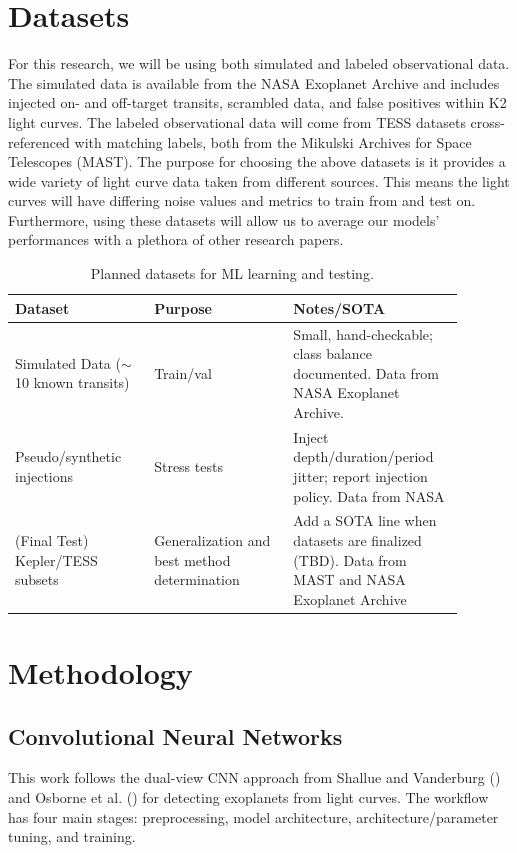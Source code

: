 \documentclass[letterpaper]{article} %
\begin{document}
\section*{Datasets}
For this research, we will be using both simulated and labeled observational data. The simulated data is available from the NASA Exoplanet Archive and includes injected on- and off-target transits, scrambled data, and false positives within K2 light curves. The labeled observational data will come from TESS datasets cross-referenced with matching labels, both from the Mikulski Archives for Space Telescopes (MAST). The purpose for choosing the above datasets is it provides a wide variety of light curve data taken from different sources. This means the light curves will have differing noise values and metrics to train from and test on. Furthermore, using these datasets will allow us to average our models' performances with a plethora of other research papers.

\begin{table}[t]
\centering
\begin{tabular}{p{0.28\linewidth} p{0.28\linewidth} p{0.33\linewidth}}
\hline
\textbf{Dataset} & \textbf{Purpose} & \textbf{Notes/SOTA} \\ \hline
Simulated Data ($\sim$10 known transits) & Train/val & Small, hand-checkable; class balance documented. Data from NASA Exoplanet Archive. \\
Pseudo/synthetic injections & Stress tests & Inject depth/duration/period jitter; report injection policy. Data from NASA \\
(Final Test) Kepler/TESS subsets & Generalization and best method determination & Add a SOTA line when datasets are finalized (TBD). Data from MAST and NASA Exoplanet Archive \\ \hline
\end{tabular}
\caption{{Planned datasets for ML learning and testing.}}
\label{{tab:datasets}}
\end{table}

\section*{Methodology}
\subsection*{Convolutional Neural Networks}
This work follows the dual-view CNN approach from Shallue and Vanderburg (\citeyear{Shallue2018identifyexoplanetsI}) and Osborne et al. (\citeyear{Osborn2019rapidclassificationtesscandidates}) for detecting exoplanets from light curves. The workflow has four main stages: preprocessing, model architecture, architecture/parameter tuning, and training.
\end{document}
